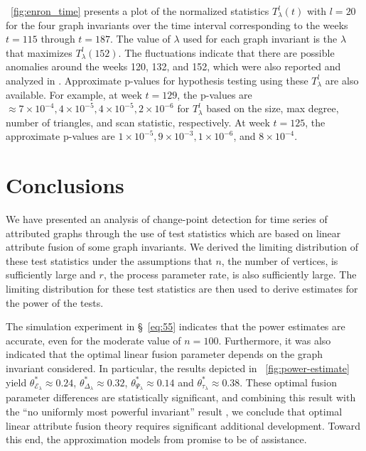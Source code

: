 \documentclass[10pt,draftclsnofoot,onecolumn]{IEEEtran}
\theoremstyle{definition}
\begin{document}
\figurename~\ref{fig:enron_time} presents a plot of the
normalized statistics $T_{\lambda}^{l}(t)$ with $l = 20$ for the four
graph invariants over the time interval corresponding to the
weeks $t = 115$ through $t = 187$. The value of $\lambda$ used
for each graph invariant is the $\lambda$ that maximizes
$T_{\lambda}^{l}(152)$. The fluctuations
indicate that there are possible anomalies around the weeks 120,
132, and 152, which were also reported and analyzed in 
\cite{priebe05:_scan_statis_enron_graph}.  Approximate p-values for
hypothesis testing using these $T_{\lambda}^{l}$ are
also available. For example, at week $t = 129$, the p-values are
$\approx 7 \times 10^{-4}, 4 \times 10^{-5}, 4 \times 10^{-5}, 2
\times 10^{-6}$ for $T_{\lambda}^{l}$ based on the size, max degree, number of
triangles, and scan statistic, respectively. At week $t = 125$, the
approximate p-values are $1 \times 10^{-5}, 9 \times 10^{-3}, 1
\times 10^{-6}$, and $8 \times10^{-4}$.
\section{Conclusions}
We have presented an analysis of change-point detection for time
series of attributed graphs through the use of test statistics which
are based on linear attribute fusion of some graph invariants. 
We derived the limiting distribution of these test statistics under
the assumptions that $n$, the number of vertices, is sufficiently
large and $r$, the process parameter rate, is also sufficiently
large. The limiting distribution for these test statistics are then
used to derive estimates for the power of the tests. 

The simulation experiment in \S~\ref{eq:55} indicates that the power estimates
are accurate, even for the moderate value of $n = 100$. Furthermore,
it was also indicated that the optimal linear fusion parameter depends
on the graph invariant considered. In particular, the results depicted
in \figurename~\ref{fig:power-estimate} yield
$\theta^{*}_{\mathcal{E}_{\lambda}} \approx 0.24$,
$\theta^{*}_{\Delta_{\lambda}} \approx 0.32$,
$\theta^{*}_{\Psi_{\lambda}} \approx 0.14$ and
$\theta^{*}_{\tau_{\lambda}} \approx 0.38$. These optimal fusion
parameter differences are statistically significant, and combining
this result with the ``no uniformly most powerful invariant'' result
\cite{pao11:_statis_infer_random_graph}, we conclude that optimal
linear attribute fusion theory requires significant additional
development. Toward this end, the approximation models from
\cite{lee11} promise to be of assistance. 
\end{document}
